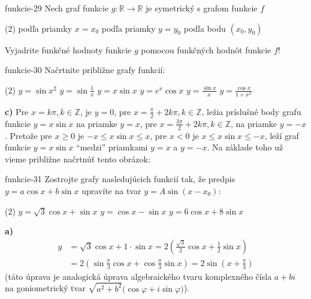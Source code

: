 \begin{defproblem}{funkcie-29}
Nech graf funkcie $g:\mathbb{R}\rightarrow\mathbb{R}$ je symetrický s grafom funkcie $f$
\begin{tasks}(2)
  \task podľa priamky $x=x_0$
  \task podľa priamky $y=y_0$
  \task podľa bodu $(x_0,y_0)$
\end{tasks}
Vyjadrite funkčné hodnoty funkcie $g$ pomocou funkčných hodnôt funkcie $f$!
\end{defproblem}

\begin{defproblem}{funkcie-30}
Načrtnite približne grafy funkcií:
\begin{tasks}(2)
  \task $y=\sin x^2$
  \task $y=\sin \frac{1}{x}$
  \task $y=x\sin x$
  \task $y=e^x\cos x$
  \task $y=\frac{\sin x}{x}$
  \task $y=\frac{\cos x}{1+x^2}$
\end{tasks}

\begin{solution}
  \textbf{c)}
  Pre $x = k \pi, k \in \mathbb{Z}$, je $y = 0$, pre $x = \frac{\pi}{2} +
  2k\pi,k\in\mathbb{Z}$, ležia príslušné body grafu funkcie $y= x \sin{x}$ na
  priamke $y = x$, pre $x = \frac{3\pi}{2} + 2k\pi, k\in\mathbb{Z}$, na priamke
  $y = -x$. Pretože pre $x \geq 0$ je $-x \leq x \sin{x} \leq x$, pre $x < 0$ je
  $x\leq x\sin x\leq -x$, leží graf funkcie $y = x\sin x$ ``medzi'' priamkami $y
  = x$ a $y = -x$. Na základe toho už vieme približne načrtnúť tento obrázok:
\end{solution}
\end{defproblem}

\begin{defproblem}{funkcie-31}
Zostrojte grafy nasledujúcich funkcií tak, že predpis $y=a\cos x +b\sin x$
upravíte na tvar $y=A\sin (x-x_0)$:
\begin{tasks}(2)
  \task $y=\sqrt{3}\cos x +\sin x$
  \task $y=\cos x -\sin x$
  \task $y=6\cos x +8\sin x$
\end{tasks}

\begin{solution}
\textbf{a)}
\vspace{-.5cm}
\begin{align*}
  y
    &= \sqrt{3} \cos{x} + 1 \cdot \sin{x}
      = 2(\frac{\sqrt{3}}{2} \cos{x} + \frac{1}{2}\sin{x}) \\
    &= 2(\sin{\frac{\pi}{3}} \cos{x} + \cos{\frac{\pi}{3}}\sin{x})
      = 2\sin{(x + \frac{\pi}{3})}
\end{align*}
(táto úprava je analogická úprava algebraického tvaru komplexného čísla $a + bi$
na goniometrický tvar $\sqrt{a^2 + b^2}(\cos{\varphi} + i \sin{\varphi)}$).
\end{solution}
\end{defproblem}

